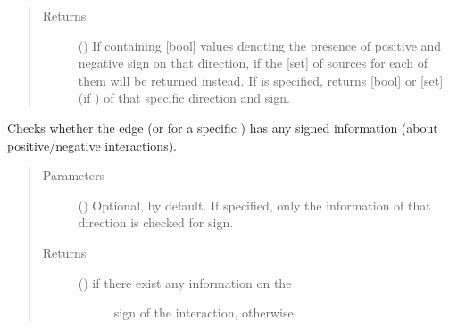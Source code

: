 \documentclass[letterpaper,10pt,english]{sphinxmanual}
\begin{document}
\begin{fulllineitems}
\begin{fulllineitems}
\begin{quote}
\begin{description}
\item[{Returns}] \leavevmode
() \textendash{} If  containing {[}bool{]} values
denoting the presence of positive and negative sign on that
direction, if  the {[}set{]} of sources for each
of them will be returned instead. If  is specified,
returns {[}bool{]} or {[}set{]} (if ) of that
specific direction and sign.

\end{description}\end{quote}

\end{fulllineitems}


\begin{fulllineitems}
\label{\detokenize{reference:pypath.main.Direction.has_sign}}
Checks whether the edge (or for a specific ) has
any signed information (about positive/negative interactions).
\begin{quote}\begin{description}
\item[{Parameters}] \leavevmode
{} () \textendash{} Optional,  by default. If specified, only the
information of that direction is checked for sign.

\item[{Returns}] \leavevmode
\begin{description}
\item[{() \textendash{}  if there exist any information on the}] \leavevmode
sign of the interaction,  otherwise.

\end{description}


\end{description}\end{quote}

\end{fulllineitems}



\end{fulllineitems}
\end{document}
